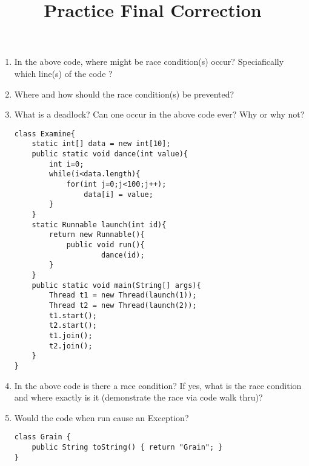 \documentclass{article}
\author{}
\date{}
\title{Practice Final Correction}
\begin{document}
\maketitle
\begin{enumerate}
\begin{lstlisting}
class Race{
	public static final int MAX = 5;
 	public static final int MIN = 1;

 	private static int data=Race.MIN;
	public static int getData(){
		return data;
	}
	public static void incData() {
		if (data < Race.MAX)
			data++;
	}
	public static void foo() throws Exception{
		while (data < Race.MAX)
			incData();
	}
}

public class Car implements Runnable { 
	public void run(){
		Race.foo();
	}
	public static void main(String[] args) throws Exception{
  		Thread t1 = new Thread(new Car());
  		Thread t2 = new Thread(new Car());
  		t1.start();
  		t2.start();
  		t1.join();
  		t2.join();
  		System.out.println(Race.getData());
 	}
}
\end{lstlisting}
	\item In the above code, where might be race condition(s) occur? Speciafically which line(s) of the code ?
	\item Where and how should the race condition(s) be prevented?
	\item What is a deadlock? Can one occur in the above code ever? Why or why not?
\newpage
\begin{lstlisting}
class Examine{
 	static int[] data = new int[10];
 	public static void dance(int value){
  		int i=0;
  		while(i<data.length){
   			for(int j=0;j<100;j++);
   				data[i] = value;
  		}
 	}
 	static Runnable launch(int id){
  		return new Runnable(){
   			public void run(){
    				dance(id);
   		}
 	}
 	public static void main(String[] args){
  		Thread t1 = new Thread(launch(1));
  		Thread t2 = new Thread(launch(2));
  		t1.start();
  		t2.start();
  		t1.join();
  		t2.join();
 	}
}
\end{lstlisting}
	\item In the above code is there a race condition? If yes, what is the race condition and where exactly is it (demonstrate the race via code walk thru)? 
	\item Would the code when run cause an Exception? 
\newpage
\begin{lstlisting}
class Grain {
  	public String toString() { return "Grain"; }
}


\end{lstlisting}
\end{enumerate}
\end{document}

